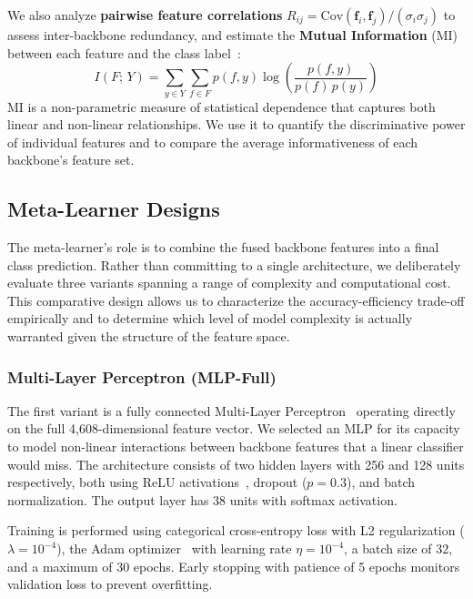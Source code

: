 \documentclass[pdflatex,sn-basic]{sn-jnl}
\begin{document}
We also analyze \textbf{pairwise feature correlations} $R_{ij} = \mathrm{Cov}(\mathbf{f}_i,\mathbf{f}_j)/(\sigma_i\sigma_j)$ to assess inter-backbone redundancy, and estimate the \textbf{Mutual Information} (MI) between each feature and the class label~\cite{kraskov2004estimating}:
\begin{equation}
    I(F;\,Y) = \sum_{y \in Y}\sum_{f \in F} p(f,y)\log\!\left(\frac{p(f,y)}{p(f)\,p(y)}\right)
    \label{eq:mi}
\end{equation}
MI is a non-parametric measure of statistical dependence that captures both linear and non-linear relationships. We use it to quantify the discriminative power of individual features and to compare the average informativeness of each backbone's feature set.

\subsection{Meta-Learner Designs}
\label{subsec:metalearners}

The meta-learner's role is to combine the fused backbone features into a final class prediction. Rather than committing to a single architecture, we deliberately evaluate three variants spanning a range of complexity and computational cost. This comparative design allows us to characterize the accuracy-efficiency trade-off empirically and to determine which level of model complexity is actually warranted given the structure of the feature space.

\subsubsection{Multi-Layer Perceptron (MLP-Full)}
\label{subsubsec:mlp_full}

The first variant is a fully connected Multi-Layer Perceptron~\cite{goodfellow2016deep} operating directly on the full 4,608-dimensional feature vector. We selected an MLP for its capacity to model non-linear interactions between backbone features that a linear classifier would miss. The architecture consists of two hidden layers with 256 and 128 units respectively, both using ReLU activations~\cite{nair2010rectified}, dropout ($p = 0.3$), and batch normalization. The output layer has 38 units with softmax activation.

Training is performed using categorical cross-entropy loss with L2 regularization ($\lambda = 10^{-4}$), the Adam optimizer~\cite{kingma2014adam} with learning rate $\eta = 10^{-4}$, a batch size of 32, and a maximum of 30 epochs. Early stopping with patience of 5 epochs monitors validation loss to prevent overfitting.
\end{document}
